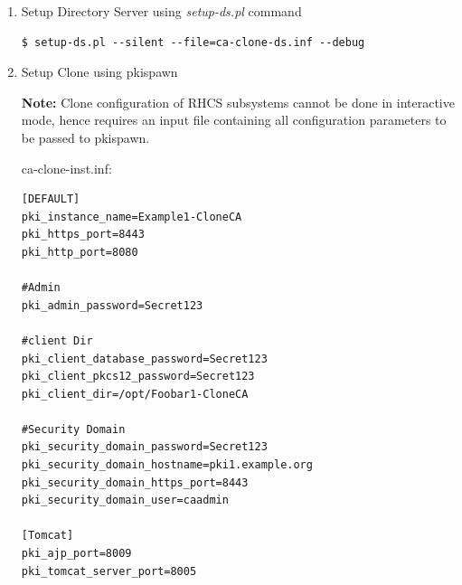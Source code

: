 \documentclass[a4paper]{article}
\begin{document}
\begin{enumerate}[label*=\arabic*.]
\begin{enumerate}[label*=\arabic*.]
ca-clone-ds.inf:                         
                        \begin{lstlisting}
[General]
FullMachineName=pki2.example.org
SuiteSpotUserID=nobody
SuiteSpotGroup=nobody

[slapd]
ServerIdentifier=Example1-Clone-CA1
ServerPort=389
Suffix=dc=example,dc=org
RootDN=cn=Directory Manager
RootDNPwd=Secret123

[admin]
ServerAdminID=admin
ServerAdminPwd=Secret123
SysUser=nobody                       
                        \end{lstlisting}
                    \item Setup Directory Server using \textit{setup-ds.pl} command
                        \begin{lstlisting}[style=bashInputStyle]
$ setup-ds.pl --silent --file=ca-clone-ds.inf --debug                    
                        \end{lstlisting}

                    \item Setup Clone using pkispawn
                    
                    \textbf{Note:} Clone configuration of RHCS subsystems cannot be done in interactive mode, hence requires
                    an input file containing all configuration parameters to be passed to pkispawn.

ca-clone-inst.inf:                    
                    \begin{lstlisting}
[DEFAULT]
pki_instance_name=Example1-CloneCA
pki_https_port=8443
pki_http_port=8080

#Admin
pki_admin_password=Secret123

#client Dir
pki_client_database_password=Secret123
pki_client_pkcs12_password=Secret123
pki_client_dir=/opt/Foobar1-CloneCA

#Security Domain
pki_security_domain_password=Secret123
pki_security_domain_hostname=pki1.example.org
pki_security_domain_https_port=8443
pki_security_domain_user=caadmin

[Tomcat]
pki_ajp_port=8009
pki_tomcat_server_port=8005


\end{lstlisting}
\end{enumerate}
\end{enumerate}
\end{document}
